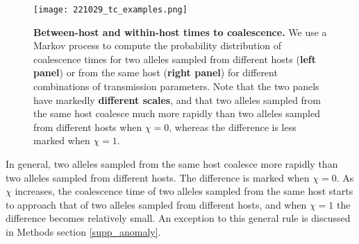 \documentclass[_main.tex]{subfiles}
\begin{document}
\begin{figure}[h!]
\centering
\texttt{[image: 221029\_tc\_examples.png]}
\caption{\textbf{Between-host and within-host times to coalescence.}  We use a Markov process to compute the probability distribution of coalescence times for two alleles sampled from different hosts (\textbf{left panel}) or from the same host (\textbf{right panel}) for different combinations of transmission parameters.  Note that the two panels have markedly \textbf{different scales}, and that two alleles sampled from the same host coalesce much more rapidly than two alleles sampled from different hosts when $\chi=0$, whereas the difference is less marked when $\chi=1$.
}
\label{fig:main_markov_3}
\end{figure}

In general, two alleles sampled from the same host coalesce more rapidly than two alleles sampled from different hosts.  The difference is marked when $\chi=0$.   As $\chi$ increases, the coalescence time of two alleles sampled from the same host starts to approach that of two alleles sampled from different hosts, and when $\chi=1$ the difference becomes relatively small.  An exception to this general rule is discussed in Methods section \ref{supp_anomaly}.
\end{document}
